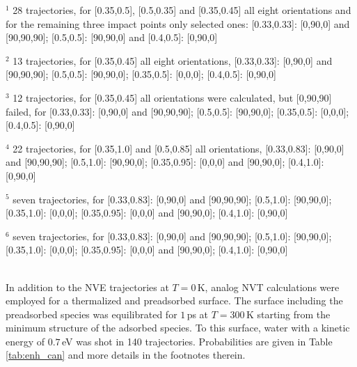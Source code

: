 \documentclass[11pt,DIV=13,BCOR=5mm,a4paper,headinclude]{scrbook}
\begin{document}
\begin{table}[hbt]
\begin{tablenotes}
 \footnotesize
\item[] $^1$ 28 trajectories, for [0.35,0.5], [0.5,0.35] and [0.35,0.45] all eight orientations and for the remaining three impact points only selected ones: [0.33,0.33]: [0,90,0] and [90,90,90]; [0.5,0.5]: [90,90,0] and [0.4,0.5]: [0,90,0]
\item[]$^2$ 13 trajectories, for [0.35,0.45] all eight orientations, [0.33,0.33]: [0,90,0] and [90,90,90]; [0.5,0.5]: [90,90,0]; [0.35,0.5]: [0,0,0]; [0.4,0.5]: [0,90,0]
\item[]$^3$ 12 trajectories, for [0.35,0.45] all orientations were calculated, but [0,90,90] failed, for [0.33,0.33]: [0,90,0] and [90,90,90]; [0.5,0.5]: [90,90,0]; [0.35,0.5]: [0,0,0]; [0.4,0.5]: [0,90,0]
\item[] $^4$ 22 trajectories, for [0.35,1.0] and [0.5,0.85] all orientations, [0.33,0.83]: [0,90,0] and [90,90,90]; [0.5,1.0]: [90,90,0]; [0.35,0.95]: [0,0,0] and [90,90,0]; [0.4,1.0]: [0,90,0]
\item[]$^5$ seven trajectories, for [0.33,0.83]: [0,90,0] and [90,90,90]; [0.5,1.0]: [90,90,0]; [0.35,1.0]: [0,0,0]; [0.35,0.95]: [0,0,0] and [90,90,0]; [0.4,1.0]: [0,90,0]
\item[]$^6$ seven trajectories, for [0.33,0.83]: [0,90,0] and [90,90,90]; [0.5,1.0]: [90,90,0]; [0.35,1.0]: [0,0,0]; [0.35,0.95]: [0,0,0] and [90,90,0]; [0.4,1.0]: [0,90,0]
\end{tablenotes}
 \label{tab:enh_micro}
\end{table}
\\
In addition to the NVE trajectories at $T=0\,$K, analog NVT calculations were employed for a thermalized and preadsorbed surface.
The surface including the preadsorbed species was equilibrated for $1\,$ps at $T=300\,$K starting from the minimum structure of the adsorbed species.
To this surface, water with a kinetic energy of $0.7\,$eV was shot in 140 trajectories.
Probabilities are given in Table \ref{tab:enh_can} and more details in the footnotes therein.
\end{document}
